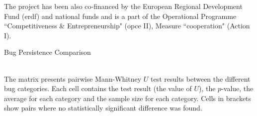 \documentclass{sig-alternate}
\begin{document}
The project has been also co-financed by the European Regional Development Fund ({\sc erdf})
and national funds and is a part of the Operational Programme ``Competitiveness \&
Entrepreneurship" ({\sc opce} II), Measure ``{\sc cooperation}" (Action I).


  

\begin{landscape}
  \begin{table}
    \setlength{\extrarowheight}{0.10cm}
    \caption{Bug Persistence Comparison}
    \label{tbl:bug_persistence}
    \resizebox{0.95\columnwidth}{!}{
    }\\
    The matrix presents pairwise Mann-Whitney $U$ test results
    between the different bug categories. Each cell contains the test
    result (the value of $U$), the $p$-value, the average for each
    category and the sample size for each category. Cells in brackets show
    pairs where no statistically significant difference was found.
  \end{table}
\end{landscape}
\end{document}
